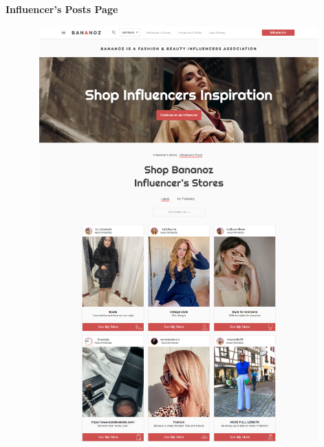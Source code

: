 \pagebreak
\textbf{Influencer’s Posts Page}
\begin{center}
\includegraphics[height=16cm,width=14cm]{Admin/influ-post.png}
\end{center}

\pagebreak

		
		


